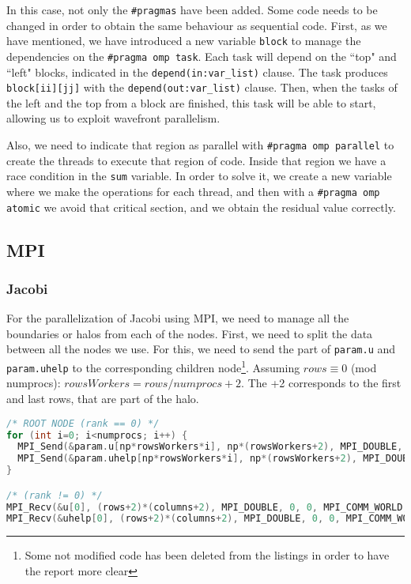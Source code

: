 \documentclass[a4paper, 10pt]{article}
\begin{document}
  In this case, not only the \texttt{\#pragmas} have been added. Some code needs to be changed in order to obtain the same behaviour as sequential code. First, as we have mentioned, we have introduced a new variable \texttt{block} to manage the dependencies on the \texttt{\#pragma omp task}. Each task will depend on the ``top" and ``left" blocks, indicated in the \texttt{depend(in:var\_list)} clause. The task produces \texttt{block[ii][jj]} with the \texttt{depend(out:var\_list)} clause. Then, when the tasks of the left and the top from a block are finished, this task will be able to start, allowing us to exploit wavefront parallelism.

  Also, we need to indicate that region as parallel with \texttt{\#pragma omp parallel} to create the threads to execute that region of code. Inside that region we have a race condition in the \texttt{sum} variable. In order to solve it, we create a new variable where we make the operations for each thread, and then with a \texttt{\#pragma omp atomic} we avoid that critical section, and we obtain the residual value correctly.

\clearpage

\subsection{MPI}

\subsubsection{Jacobi}

For the parallelization of Jacobi using MPI, we need to manage all the boundaries or halos from each of the nodes. First, we need to split the data between all the nodes we use. For this, we need to send the part of \texttt{param.u} and \texttt{param.uhelp} to the corresponding children node\footnote{Some not modified code has been deleted from the listings in order to have the report more clear}. Assuming $rows \equiv 0 $ (mod numprocs): $rowsWorkers = rows / numprocs + 2$. The +2 corresponds to the first and last rows, that are part of the halo.

\begin{lstlisting}[language=c, caption={Sending/Receiving initial data to all nodes}]
/* ROOT NODE (rank == 0) */
for (int i=0; i<numprocs; i++) {
  MPI_Send(&param.u[np*rowsWorkers*i], np*(rowsWorkers+2), MPI_DOUBLE, i, 0, MPI_COMM_WORLD);
  MPI_Send(&param.uhelp[np*rowsWorkers*i], np*(rowsWorkers+2), MPI_DOUBLE, i, 0, MPI_COMM_WORLD);
}    

/* (rank != 0) */
MPI_Recv(&u[0], (rows+2)*(columns+2), MPI_DOUBLE, 0, 0, MPI_COMM_WORLD, &status);
MPI_Recv(&uhelp[0], (rows+2)*(columns+2), MPI_DOUBLE, 0, 0, MPI_COMM_WORLD, &status);
\end{lstlisting}
\end{document}
